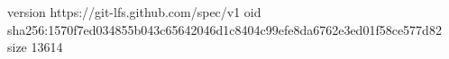 version https://git-lfs.github.com/spec/v1
oid sha256:1570f7ed034855b043c65642046d1c8404c99efe8da6762e3ed01f58ce577d82
size 13614
